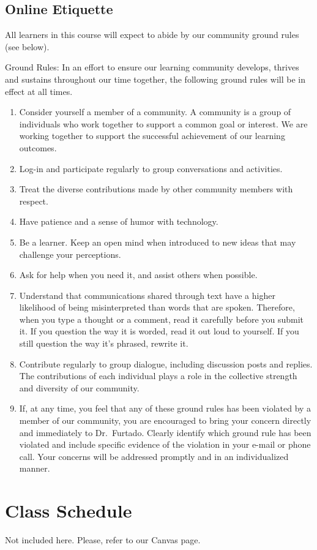 \documentclass[11pt,]{article}
\providecommand{\tightlist}{%
  \setlength{\itemsep}{0pt}\setlength{\parskip}{0pt}}
\begin{document}
\hypertarget{online-etiquette}{%
\subsection{Online Etiquette}\label{online-etiquette}}

All learners in this course will expect to abide by our community ground
rules (see below).

Ground Rules: In an effort to ensure our learning community develops,
thrives and sustains throughout our time together, the following ground
rules will be in effect at all times.

\begin{enumerate}
\def\labelenumi{\arabic{enumi}.}
\tightlist
\item
  Consider yourself a member of a community. A community is a group of
  individuals who work together to support a common goal or interest. We
  are working together to support the successful achievement of our
  learning outcomes.
\item
  Log-in and participate regularly to group conversations and
  activities.
\item
  Treat the diverse contributions made by other community members with
  respect.
\item
  Have patience and a sense of humor with technology.
\item
  Be a learner. Keep an open mind when introduced to new ideas that may
  challenge your perceptions.
\item
  Ask for help when you need it, and assist others when possible.
\item
  Understand that communications shared through text have a higher
  likelihood of being misinterpreted than words that are spoken.
  Therefore, when you type a thought or a comment, read it carefully
  before you submit it. If you question the way it is worded, read it
  out loud to yourself. If you still question the way it's phrased,
  rewrite it.
\item
  Contribute regularly to group dialogue, including discussion posts and
  replies. The contributions of each individual plays a role in the
  collective strength and diversity of our community.
\item
  If, at any time, you feel that any of these ground rules has been
  violated by a member of our community, you are encouraged to bring
  your concern directly and immediately to Dr.~Furtado. Clearly identify
  which ground rule has been violated and include specific evidence of
  the violation in your e-mail or phone call. Your concerns will be
  addressed promptly and in an individualized manner.
\end{enumerate}

\hypertarget{class-schedule}{%
\section{Class Schedule}\label{class-schedule}}

Not included here. Please, refer to our Canvas page.
\end{document}

